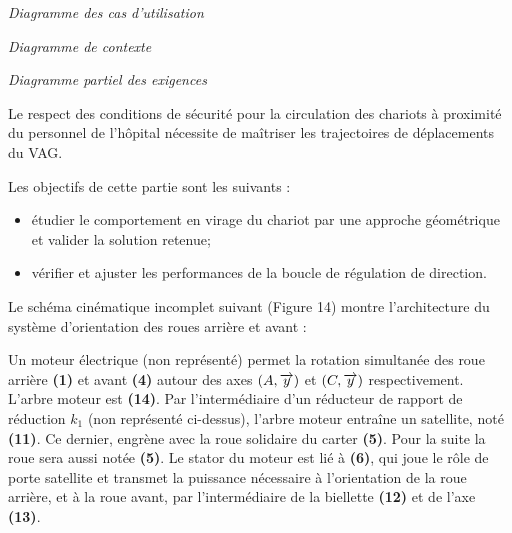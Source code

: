 \documentclass[10pt]{article}
\begin{document}
\begin{minipage}[c]{.3\linewidth}
\begin{center}

\textit{Diagramme des cas d'utilisation}
\end{center}
\end{minipage} \hfill
\begin{minipage}[c]{.3\linewidth}
\begin{center}

\textit{Diagramme de contexte}
\end{center}
\end{minipage} \hfill
\begin{minipage}[c]{.38\linewidth}
\begin{center}

\textit{Diagramme partiel des exigences}
\end{center}
\end{minipage}

Le respect des conditions de sécurité pour la circulation des chariots à proximité du personnel de l'hôpital nécessite de maîtriser les trajectoires de déplacements du VAG.

\begin{obj}
Les objectifs de cette partie sont les suivants :
\begin{itemize}
\item étudier le comportement en virage du chariot par une approche géométrique et valider la solution retenue;
\item vérifier et ajuster les performances de la boucle de régulation de direction.
\end{itemize}
\end{obj}

Le schéma cinématique incomplet suivant (Figure 14) montre l’architecture du système d’orientation des roues arrière et avant :

Un moteur électrique (non représenté) permet la rotation simultanée des roue arrière \textbf{(1)} et avant \textbf{(4)} autour des axes $\left(A,\overrightarrow{y} \right)$ et $\left(C,\overrightarrow{y} \right)$ respectivement. L’arbre moteur est \textbf{(14)}. Par l’intermédiaire d’un réducteur de rapport de réduction $k_1$ (non représenté ci-dessus), l’arbre moteur entraîne un satellite, noté \textbf{(11)}. Ce dernier, engrène avec la roue solidaire du carter \textbf{(5)}. Pour la suite la roue sera aussi notée \textbf{(5)}. Le stator du moteur est lié à \textbf{(6)}, qui joue le rôle de porte satellite et transmet la puissance nécessaire à l’orientation de la roue arrière, et à la roue avant, par l’intermédiaire de la biellette \textbf{(12)} et de l’axe \textbf{(13)}.
\end{document}
